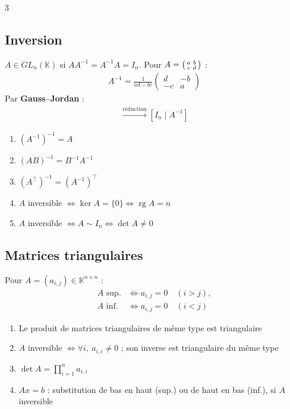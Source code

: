 \documentclass[12pt, a4paper]{article}
\newcommand{\KK}{\mathbb{K}}
\newcommand{\rg}{\operatorname{rg}}
\begin{document}
\begin{multicols*}{3}
\subsection{Inversion}
$A\in GL_n(\KK)$ si $AA^{-1}=A^{-1}A=I_n$. Pour $A=\begin{psmallmatrix}a&b\\c&d\end{psmallmatrix}$ :
\begin{align*}
A^{-1}=\frac1{ad-bc}\begin{pmatrix}d&-b\\-c&a\end{pmatrix}
\end{align*}
Par \textbf{Gauss--Jordan} :
\begin{align*}
[A\mid I_n]\xrightarrow{\text{réduction}}[I_n\mid A^{-1}]
\end{align*}
\begin{enumerate}
\item $(A^{-1})^{-1}=A$
\item $(AB)^{-1}=B^{-1}A^{-1}$
\item $(A^\top)^{-1}=(A^{-1})^\top$
\item $A$ inversible $\iff\ker A=\{0\}\iff\rg A=n$
\item $A$ inversible $\iff A\sim I_n\iff\det A\ne0$
\end{enumerate}

\colbreak
\subsection{Matrices triangulaires}
Pour $A=(a_{i,j})\in\KK^{n\times n}$ :
\begin{align*}
A\text{ sup.}&\iff a_{i,j}=0\quad(i>j),\\
A\text{ inf.}&\iff a_{i,j}=0\quad(i<j)
\end{align*}
\begin{enumerate}
\item Le produit de matrices triangulaires de même type est triangulaire
\item $A$ inversible $\iff\forall i,\ a_{i,i}\ne0$ ; son inverse est triangulaire du même type
\item $\det A=\prod_{i=1}^n a_{i,i}$ 
\item $Ax=b$ : substitution de bas en haut (sup.) ou de haut en bas (inf.), si $A$ inversible
\end{enumerate}


\end{multicols*}
\end{document}
